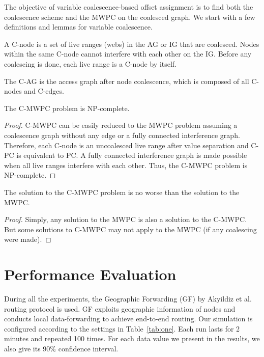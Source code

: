 The objective of variable coalescence-based offset assignment is to find
both the coalescence scheme and the MWPC on the coalesced graph. We start
with a few definitions and lemmas for variable coalescence.

\begin{definition}A C-node is a set of
live ranges (webs) in the AG or IG that are coalesced. Nodes within the same
C-node cannot interfere with each other on the IG. Before any coalescing is
done, each live range is a C-node by itself.
\end{definition}

\begin{definition}The C-AG is the access
graph after node coalescence, which is composed of all C-nodes and C-edges.
\end{definition}

\begin{lemma}
The C-MWPC problem is NP-complete.
\end{lemma}
\begin{proof} C-MWPC can be easily reduced to the MWPC problem assuming a
coalescence graph without any edge or a fully connected interference graph.
Therefore, each C-node is an uncoalesced live range after value separation
and C-PC is equivalent to PC. A fully connected interference graph is made
possible when all live ranges interfere with each other. Thus, the C-MWPC
problem is NP-complete.
\end{proof}

\begin{lemma}The solution to the C-MWPC problem is no
worse than the solution to the MWPC.
\end{lemma}
\begin{proof}
Simply, any solution to the MWPC is also a solution to the
C-MWPC. But some solutions to C-MWPC may not apply to the MWPC (if any
coalescing were made).
\end{proof}

\section{Performance Evaluation}

During all the experiments, the Geographic Forwarding (GF) by Akyildiz
et al.~ routing protocol is used. GF exploits
geographic information of nodes and conducts local data-forwarding to
achieve end-to-end routing. Our simulation is configured according to
the settings in Table~\ref{tab:one}. Each run lasts for 2 minutes and
repeated 100 times. For each data value we present in the results, we
also give its 90\% confidence interval.

